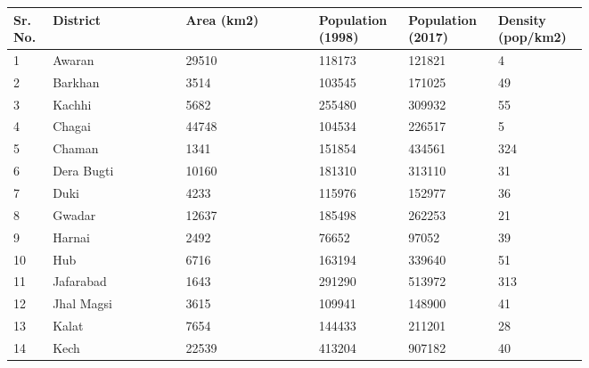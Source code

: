 \begin{longtable}[H]{|p{0.05\linewidth} | p{0.2\linewidth} | p{0.2\linewidth} | p{0.1\linewidth} | p{0.1\linewidth} | p{0.1\linewidth}|}
    \hline
    Sr. No. & District       & Area (km2)                       & Population (1998) & Population (2017) & Density (pop/km2) \\
    \hline
    1       & Awaran         & 29510                            & 118173            & 121821            & 4                 \\
    2       & Barkhan        & 3514                             & 103545            & 171025            & 49                \\
    3       & Kachhi         & 5682                             & 255480            & 309932            & 55                \\
    4       & Chagai         & 44748                            & 104534            & 226517            & 5                 \\
    5       & Chaman         & 1341                             & 151854            & 434561            & 324               \\
    6       & Dera Bugti     & 10160                            & 181310            & 313110            & 31                \\
    7       & Duki           & 4233                             & 115976            & 152977            & 36                \\
    8       & Gwadar         & 12637                            & 185498            & 262253            & 21                \\
    9       & Harnai         & 2492                             & 76652             & 97052             & 39                \\
    10      & Hub            & 6716                             & 163194            & 339640            & 51                \\
    11      & Jafarabad      & 1643                             & 291290            & 513972            & 313               \\
    12      & Jhal Magsi     & 3615                             & 109941            & 148900            & 41                \\
    13      & Kalat          & 7654                             & 144433            & 211201            & 28                \\
    14      & Kech           & 22539                            & 413204            & 907182            & 40                \\

\end{longtable}
